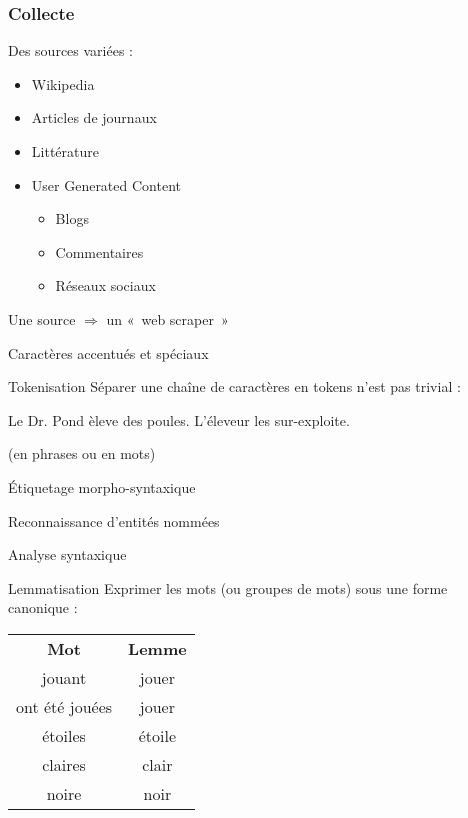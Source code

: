 \begin{frame}
  \frametitle{Collecte}
  Des sources variées :
  \begin{itemize}
  \item Wikipedia
  \item Articles de journaux
  \item Littérature
  \item User Generated Content
    \begin{itemize}
    \item Blogs
    \item Commentaires
    \item Réseaux sociaux
    \end{itemize}
  \end{itemize}
  Une source $\Rightarrow$ un «~web scraper~»
\end{frame}

\begin{frame}{Caractères accentués et spéciaux}
\end{frame}

\begin{frame}{Tokenisation}
  Séparer une chaîne de caractères en tokens n'est pas trivial :

  \begin{center}
    Le Dr. Pond èleve des poules. L'éleveur les sur-exploite.
  \end{center}

  (en phrases ou en mots)
\end{frame}

\begin{frame}{Étiquetage morpho-syntaxique}
\end{frame}

\begin{frame}{Reconnaissance d'entités nommées}
\end{frame}

\begin{frame}{Analyse syntaxique}
\end{frame}

\begin{frame}{Lemmatisation}
  Exprimer les mots (ou groupes de mots) sous une forme canonique : \\

  \centering
  \begin{tabular}{cc}
    \textbf{Mot} & \textbf{Lemme} \\
    jouant & jouer \\
    ont été jouées & jouer \\
    étoiles & étoile \\
    claires & clair \\
    noire & noir
  \end{tabular}
\end{frame}

